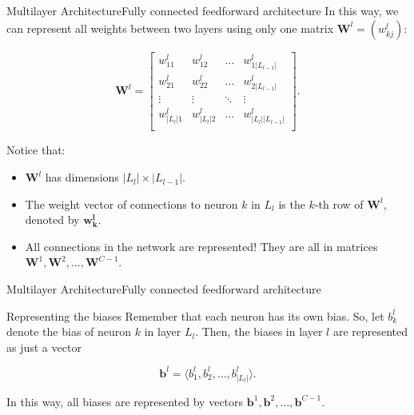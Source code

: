 \documentclass{beamer}
\begin{document}
        \begin{frame}{Multilayer Architecture}{Fully connected feedforward architecture}
                In this way, we can represent all weights between two layers
                using only one matrix $\mathbf{W}^l = (w^l_{kj})$:
        
                \[
                    \mathbf{W}^l = 
                    \begin{bmatrix}
                        w^l_{11} & w^l_{12} & \ldots & w^l_{1|L_{l-1}|}\\
                        w^l_{21} & w^l_{22} & \ldots & w^l_{2|L_{l-1}|}\\
                        \vdots & \vdots & \ddots & \vdots\\
                        w^l_{|L_l|1} & w^l_{|L_l|2} & \ldots & w^l_{|L_l||L_{l-1}|}\\
                    \end{bmatrix}.
                \]                

                Notice that: 
                \begin{itemize}
                    \item $\mathbf{W}^l$ has dimensions $|L_l| \times |L_{l-1}|$.
                    \item The weight vector of connections to neuron $k$ in $L_l$ is the $k$-th row of $\mathbf{W}^l$, denoted by $\mathbf{w^l_k}$.
                    \item All connections in the network are represented! They are all in matrices $\mathbf{W}^1, \mathbf{W}^2, \ldots, \mathbf{W}^{C-1}$.
                \end{itemize}
        \end{frame}

        \begin{frame}{Multilayer Architecture}{Fully connected feedforward architecture}
            \begin{block}{Representing the biases}
                Remember that each neuron has its own bias. So, let $b^l_k$ denote the
                bias of neuron $k$ in layer $L_l$. Then, the biases in layer $l$ are 
                represented as just a vector 

                $$\mathbf{b}^l = \langle b^l_1, b^l_2, \ldots, b^l_{|L_{l}|} \rangle.$$
                
                In this way, all biases are represented by vectors $\mathbf{b}^1, \mathbf{b}^2, \ldots, \mathbf{b}^{C-1}.$
            \end{block}
        \end{frame}
\end{document}
